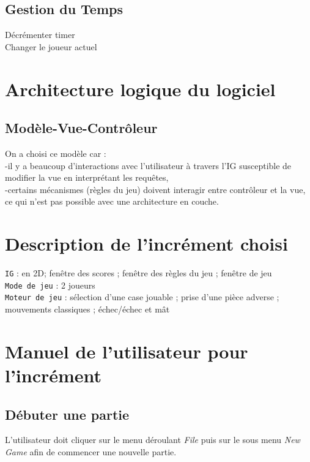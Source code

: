 \documentclass[12pt,a4paper]{report}
\begin{document}
\section*{Gestion du Temps}
Décrémenter timer
\\Changer le joueur actuel

\maketitle
\chapter*{Architecture logique du logiciel}
\section*{Modèle-Vue-Contrôleur}
On a choisi ce modèle car :
\\-il y a beaucoup d'interactions avec l’utilisateur à travers l’IG susceptible de modifier la vue en interprétant les requêtes,
\\-certains mécanismes (règles du jeu) doivent interagir entre contrôleur et la vue, ce qui n’est pas possible avec une architecture en couche.

\maketitle
\chapter*{Description de l'incrément choisi}
{\tt IG} : en 2D; fenêtre des scores ; fenêtre des règles du jeu ; fenêtre de jeu
\\{\tt Mode de jeu} : 2 joueurs
\\{\tt Moteur de jeu} : sélection d'une case jouable ; prise d'une pièce adverse ; mouvements classiques ; échec/échec et mât 

\maketitle
\chapter*{Manuel de l'utilisateur pour l'incrément}

\section*{Débuter une partie}
L'utilisateur doit cliquer sur le menu déroulant {\it File} puis sur le sous menu {\it New Game} afin de commencer une nouvelle partie.
\end{document}
